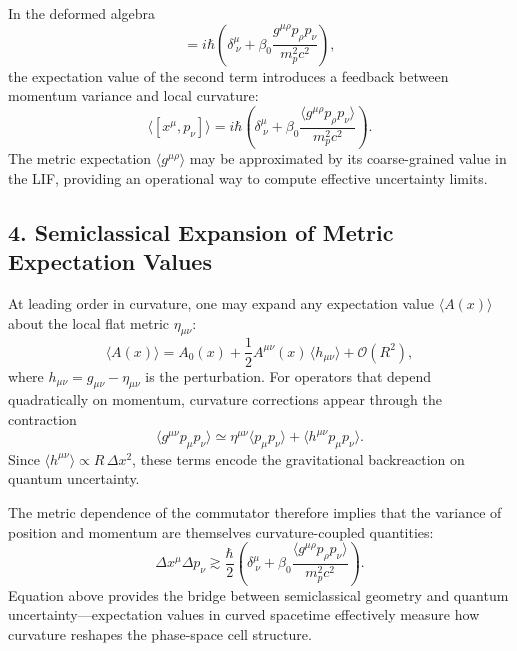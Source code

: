 \documentclass[11pt,oneside]{book}
\numberwithin{equation}{chapter}
\begin{document}
In the deformed algebra
\begin{equation}
[x^\mu,p_\nu]
=i\hbar\!\left(\delta^\mu_{\ \nu}
+\beta_0\frac{g^{\mu\rho}p_\rho p_\nu}{m_p^2 c^2}\right),
\end{equation}
the expectation value of the second term introduces a feedback between momentum variance and local curvature:
\begin{equation}
\langle [x^\mu,p_\nu] \rangle
= i\hbar\!\left(
\delta^\mu_{\ \nu}
+ \beta_0\frac{\langle g^{\mu\rho}p_\rho p_\nu\rangle}
{m_p^2 c^2}
\right).
\end{equation}
The metric expectation $\langle g^{\mu\rho} \rangle$ may be approximated by its coarse-grained value in the LIF, providing an operational way to compute effective uncertainty limits.

\subsection*{4. Semiclassical Expansion of Metric Expectation Values}

At leading order in curvature, one may expand any expectation value $\langle A(x) \rangle$ about the local flat metric $\eta_{\mu\nu}$:
\begin{equation}
\langle A(x) \rangle
= A_0(x) + \frac{1}{2}A^{\mu\nu}(x)\,\langle h_{\mu\nu}\rangle
+ \mathcal{O}(R^2),
\end{equation}
where $h_{\mu\nu}=g_{\mu\nu}-\eta_{\mu\nu}$ is the perturbation.  
For operators that depend quadratically on momentum, curvature corrections appear through the contraction
\begin{equation}
\langle g^{\mu\nu}p_\mu p_\nu \rangle
\simeq \eta^{\mu\nu}\langle p_\mu p_\nu \rangle
+ \langle h^{\mu\nu}p_\mu p_\nu \rangle.
\end{equation}
Since $\langle h^{\mu\nu}\rangle\!\propto\!R\,\Delta x^2$, these terms encode the gravitational backreaction on quantum uncertainty.

The metric dependence of the commutator therefore implies that the variance of position and momentum are themselves curvature-coupled quantities:
\begin{equation}
\Delta x^\mu \Delta p_\nu
\gtrsim
\frac{\hbar}{2}
\left(
\delta^\mu_{\ \nu}
+ \beta_0\frac{
\langle g^{\mu\rho}p_\rho p_\nu\rangle}
{m_p^2 c^2}
\right).
\end{equation}
Equation above provides the bridge between semiclassical geometry and quantum uncertainty—expectation values in curved spacetime effectively measure how curvature reshapes the phase-space cell structure.
\end{document}
